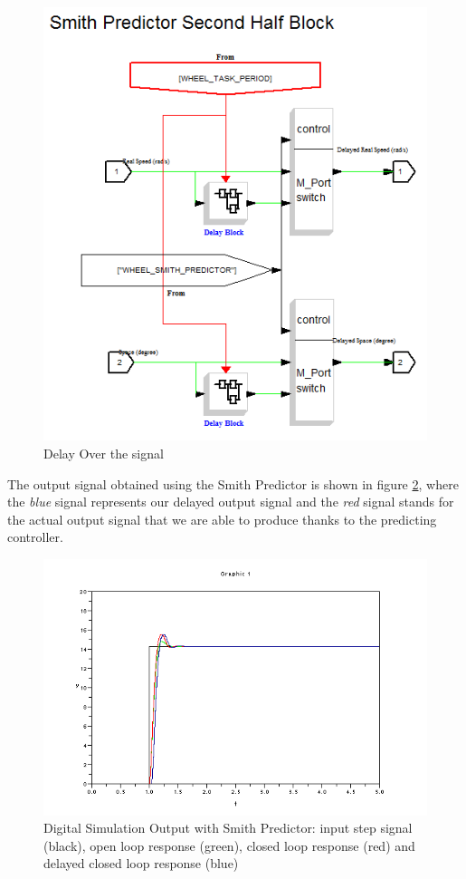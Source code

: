 \begin{figure}[H]
\center
  \includegraphics[scale=0.49]{FIGURES_3/Wheel_SmithPredictor_02.png}
  \caption[SOSModel]{Delay Over the signal}
  \label{fig:smith2}
\end{figure}

The output signal obtained using the Smith Predictor is shown in figure \ref{fig:sim_yesAW_yesSP}, where the \textit{blue} signal represents our delayed output signal and the \textit{red} signal stands for the actual output signal that we are able to produce thanks to the predicting controller.

\begin{figure}[H]
\center
  \includegraphics[scale=0.51]{FIGURES_3/Simulation_yesAW_yesSP.png}
  \caption[SOSModel]{Digital Simulation Output with Smith Predictor: input step signal (black), open loop response (green), closed loop response (red) and delayed closed loop response (blue)}
  \label{fig:sim_yesAW_yesSP}
\end{figure}


